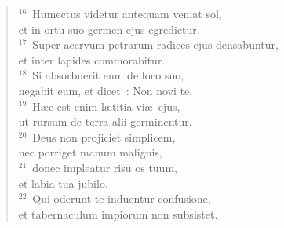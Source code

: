 \begin{flushleft}
\begin{verse}
${}^{16}$~Humectus videtur antequam veniat sol,\\ et in ortu suo germen ejus egredietur.\\
${}^{17}$~Super acervum petrarum radices ejus densabuntur,\\ et inter lapides commorabitur.\\
${}^{18}$~Si absorbuerit eum de loco suo,\\ negabit eum, et dicet~: Non novi te.\\
${}^{19}$~H\ae c est enim l\ae titia vi\ae\ ejus,\\ ut rursum de terra alii germinentur.\\
${}^{20}$~Deus non projiciet simplicem,\\ nec porriget manum malignis,\\
${}^{21}$~donec impleatur risu os tuum,\\ et labia tua jubilo.\\
${}^{22}$~Qui oderunt te induentur confusione,\\ et tabernaculum impiorum non subsistet.\end{verse}\end{flushleft}



